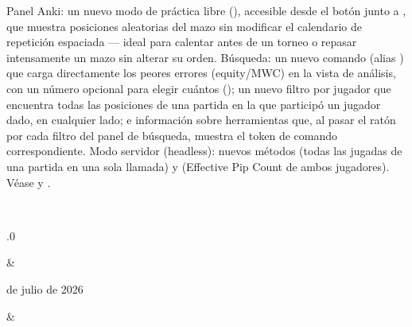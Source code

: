 \documentclass[letterpaper,10pt,spanish]{sphinxmanual}
\begin{document}
\begin{savenotes}
\begin{longtable}{}
\begin{varwidth}[t]{}
Panel Anki: un nuevo modo de práctica libre (), accesible desde el botón  junto a , que muestra posiciones aleatorias del mazo sin modificar el calendario de repetición espaciada — ideal para calentar antes de un torneo o repasar intensamente un mazo sin alterar su orden. Búsqueda: un nuevo comando  (alias ) que carga directamente los peores errores (equity/MWC) en la vista de análisis, con un número opcional para elegir cuántos (); un nuevo filtro por jugador  que encuentra todas las posiciones de una partida en la que participó un jugador dado, en cualquier lado; e información sobre herramientas que, al pasar el ratón por cada filtro del panel de búsqueda, muestra el token de comando correspondiente. Modo servidor (headless): nuevos métodos  (todas las jugadas de una partida en una sola llamada) y  (Effective Pip Count de ambos jugadores). Véase {\hyperref[\detokenize{manuel:panneau-anki}]{}} y {\hyperref[\detokenize{cmd_mode:cmd-mode}]{}}.
\sphinxbeforeendvarwidth
\end{varwidth}%
\\
\sphinxhline\begin{varwidth}[t]{}
.0
\sphinxbeforeendvarwidth
\end{varwidth}%
&\begin{varwidth}[t]{}
 de julio de 2026
\sphinxbeforeendvarwidth
\end{varwidth}%
&\begin{varwidth}[t]{}
\sphinxAtStartPar

\end{varwidth}
\end{longtable}
\end{savenotes}
\end{document}
